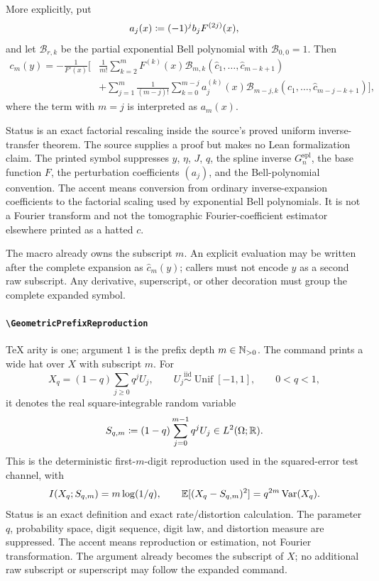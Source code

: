 \documentclass[11pt,oneside]{article}
\theoremstyle{definition}
\theoremstyle{remark}
\DeclareRobustCommand{\commandname}[1]{\texttt{\textbackslash#1}}
\DeclareRobustCommand{\localaccentname}[1]{\commandname{#1}}
\begin{document}
More explicitly, put
\[
 a_j(x)\mathrel{\coloneqq}(-1)^j b_jF^{(2j)}(x),
\]
and let \(\mathcal B_{r,k}\) be the partial exponential Bell polynomial with
\(\mathcal B_{0,0}=1\).  Then
\[
\begin{aligned}
 c_m(y)=-\frac1{F'(x)}\Bigg[&
 \frac1{m!}\sum_{k=2}^{m}F^{(k)}(x)
 \mathcal B_{m,k}
   (\widehat c_1,\ldots,\widehat c_{m-k+1})\\
 &+\sum_{j=1}^{m}\frac1{(m-j)!}
   \sum_{k=0}^{m-j}a_j^{(k)}(x)
 \mathcal B_{m-j,k}
   (\widehat c_1,\ldots,\widehat c_{m-j-k+1})
 \Bigg],
\end{aligned}
\]
where the term with \(m=j\) is interpreted as \(a_m(x)\).

Status is an exact factorial rescaling inside the source's proved uniform
inverse-transfer theorem.  The source supplies a proof but makes no Lean
formalization claim.  The printed symbol suppresses \(y\), \(\eta\), \(J\),
\(q\), the spline inverse \(G_n^{\mathrm{spl}}\), the base function \(F\),
the perturbation coefficients \((a_j)\), and the Bell-polynomial convention.
The accent means conversion from ordinary inverse-expansion coefficients to
the factorial scaling used by exponential Bell polynomials.  It is not a
Fourier transform and not the tomographic Fourier-coefficient estimator
elsewhere printed as a hatted \(c\).

The macro already owns the subscript \(m\).  An explicit evaluation may be
written after the complete expansion as \(\widehat c_m(y)\); callers must not
encode \(y\) as a second raw subscript.  Any derivative, superscript, or
other decoration must group the complete expanded symbol.

\paragraph{\localaccentname{GeometricPrefixReproduction}}
TeX arity is one; argument \(1\) is the prefix depth
\(m\in\mathbb{N}_{>0}\).  The command prints a wide hat over \(X\) with
subscript \(m\).  For
\[
 X_q=(1-q)\sum_{j\ge0}q^jU_j,\qquad
 U_j\stackrel{\mathrm{iid}}{\sim}\operatorname{Unif}[-1,1],
 \qquad0<q<1,
\]
it denotes the real square-integrable random variable
\[
 S_{q,m}
 \mathrel{\coloneqq}
 (1-q)\sum_{j=0}^{m-1}q^jU_j
 \in L^2(\Omega;\mathbb{R}).
\]
This is the deterministic first-\(m\)-digit reproduction used in the
squared-error test channel, with
\[
 I(X_q;S_{q,m})=m\log(1/q),
 \qquad
 \mathbb{E}[(X_q-S_{q,m})^2]=q^{2m}\operatorname{Var}(X_q).
\]
Status is an exact definition and exact rate/distortion calculation.
The parameter \(q\), probability space, digit sequence, digit law, and
distortion measure are suppressed.  The accent means reproduction or
estimation, not Fourier transformation.  The argument already becomes the
subscript of \(X\); no additional raw subscript or superscript may follow the
expanded command.
\end{document}
